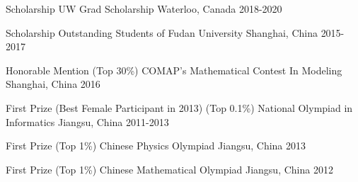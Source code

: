 


\begin{cvhonors}


  \cvhonor
    {Scholarship} %
    {UW Grad Scholarship} %
    {Waterloo, Canada} %
    {2018-2020} %

\end{cvhonors}


\begin{cvhonors}

  \cvhonor
    {Scholarship} %
    {Outstanding Students of Fudan University} %
    {Shanghai, China} %
    {2015-2017} %

  \cvhonor
    {Honorable Mention (Top 30\%)} %
    {COMAP's Mathematical Contest In Modeling} %
    {Shanghai, China} %
    {2016} %

  \cvhonor
    {First Prize (Best Female Participant in 2013) (Top 0.1\%)} %
    {National Olympiad in Informatics} %
    {Jiangsu, China} %
    {2011-2013} %

  \cvhonor
    {First Prize (Top 1\%)} %
    {Chinese Physics Olympiad} %
    {Jiangsu, China} %
    {2013} %

  \cvhonor
    {First Prize (Top 1\%)} %
    {Chinese Mathematical Olympiad} %
    {Jiangsu, China} %
    {2012} %

\end{cvhonors}


